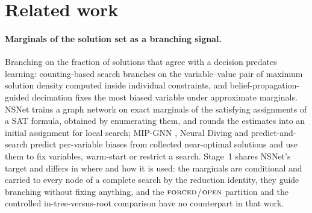 \documentclass[final,5p,times,twocolumn,authoryear]{elsarticle}
\newcommand{\FORCED}{\textsc{forced}}
\newcommand{\FREE}{\textsc{open}}
\begin{document}
\section{Related work}
\label{sec:related}

\paragraph{Marginals of the solution set as a branching signal.} Branching on the fraction of solutions that agree with a decision predates learning: counting-based search \citep{pesant2012counting} branches on the variable--value pair of maximum solution density computed inside individual constraints, and belief-propagation-guided decimation \citep{montanari2007solving} fixes the most biased variable under approximate marginals. NSNet \citep{li2022nsnet} trains a graph network on exact marginals of the satisfying assignments of a SAT formula, obtained by enumerating them, and rounds the estimates into an initial assignment for local search; MIP-GNN \citep{khalil2022mipgnn}, Neural Diving \citep{nair2020solving} and predict-and-search \citep{han2023gnn} predict per-variable biases from collected near-optimal solutions and use them to fix variables, warm-start or restrict a search. Stage~1 shares NSNet's target and differs in where and how it is used: the marginals are conditional and carried to every node of a complete search by the reduction identity, they guide branching without fixing anything, and the $\FORCED$/$\FREE$ partition and the controlled in-tree-versus-root comparison have no counterpart in that work.
\end{document}
